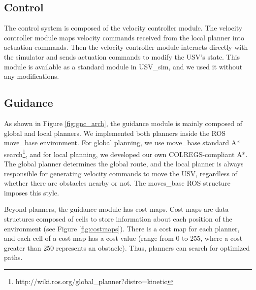     
    \subsection{Control}
    \label{sec:chap4_control}
    
        The control system is composed of the velocity controller module. The velocity controller module maps velocity commands received from the local planner into actuation commands. Then the velocity controller module interacts directly with the simulator and sends actuation commands to modify the \ac{USV}'s state.  This module is available as a standard module in USV\_sim, and we used it without any modifications.
        
    \subsection{Guidance}
    \label{sec:chap4_guidance}

        As shown in Figure \ref{fig:gnc_arch}, the guidance module is mainly composed of global and local planners. We implemented both planners inside the ROS move\_base environment. For global planning, we use move\_base standard A* search\footnote{http://wiki.ros.org/global\_planner?distro=kinetic}, and for local planning, we developed our own COLREGS-compliant A*. The global planner determines the global route, and the local planner is always responsible for generating velocity commands to move the \ac{USV}, regardless of whether there are obstacles nearby or not. The moves\_base ROS structure imposes this style.
        
        Beyond planners, the guidance module has cost maps. Cost maps are data structures composed of cells to store information about each position of the environment (see Figure \ref{fig:costmaps}). There is a cost map for each planner, and each cell of a cost map has a cost value (range from 0 to 255, where a cost greater than 250 represents an obstacle). Thus, planners can search for optimized paths. 
        
